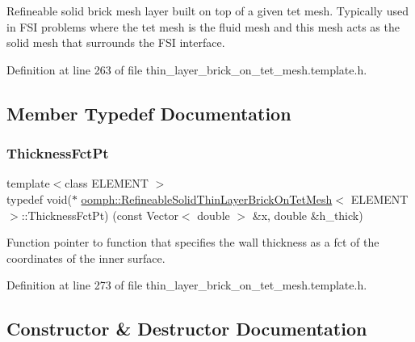 Refineable solid brick mesh layer built on top of a given tet mesh. Typically used in F\+SI problems where the tet mesh is the fluid mesh and this mesh acts as the solid mesh that surrounds the F\+SI interface. 

Definition at line 263 of file thin\+\_\+layer\+\_\+brick\+\_\+on\+\_\+tet\+\_\+mesh.\+template.\+h.



\subsection{Member Typedef Documentation}
\mbox{\label{classoomph_1_1RefineableSolidThinLayerBrickOnTetMesh_a45af8cb1926cec40d597eb18b75b96da}} 
\subsubsection{\texorpdfstring{Thickness\+Fct\+Pt}{ThicknessFctPt}}
{\footnotesize\ttfamily template$<$class E\+L\+E\+M\+E\+NT $>$ \\
typedef void($\ast$ \hyperlink{classoomph_1_1RefineableSolidThinLayerBrickOnTetMesh}{oomph\+::\+Refineable\+Solid\+Thin\+Layer\+Brick\+On\+Tet\+Mesh}$<$ E\+L\+E\+M\+E\+NT $>$\+::Thickness\+Fct\+Pt) (const Vector$<$ double $>$ \&x, double \&h\+\_\+thick)}



Function pointer to function that specifies the wall thickness as a fct of the coordinates of the inner surface. 



Definition at line 273 of file thin\+\_\+layer\+\_\+brick\+\_\+on\+\_\+tet\+\_\+mesh.\+template.\+h.



\subsection{Constructor \& Destructor Documentation}
\mbox{\label{classoomph_1_1RefineableSolidThinLayerBrickOnTetMesh_adda15e0208b20e1c1f5404c27850fb1b}} 
